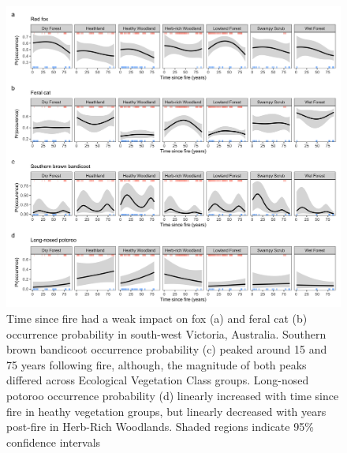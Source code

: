 \documentclass[11pt,a4paper,titlepage,twoside,openright]{style/unimelbthesis}
\begin{document}
\begin{mainmatter}
\begin{figure}
{\centering \includegraphics[width=1\linewidth]{figure/tsf} 

}

\caption{Time since fire had a weak impact on fox (a) and feral cat (b) occurrence probability in south-west Victoria, Australia. Southern brown bandicoot occurrence probability (c) peaked around 15 and 75 years following fire, although, the magnitude of both peaks differed across Ecological Vegetation Class groups. Long-nosed potoroo occurrence probability (d) linearly increased with time since fire in heathy vegetation groups, but linearly decreased with years post-fire in Herb-Rich Woodlands. Shaded regions indicate 95\% confidence intervals}\label{fig:occ-tsf}
\end{figure}
\newpage

\(~\)

\(~\)

\(~\)
\begin{figure}


\end{figure}
\end{mainmatter}
\end{document}
